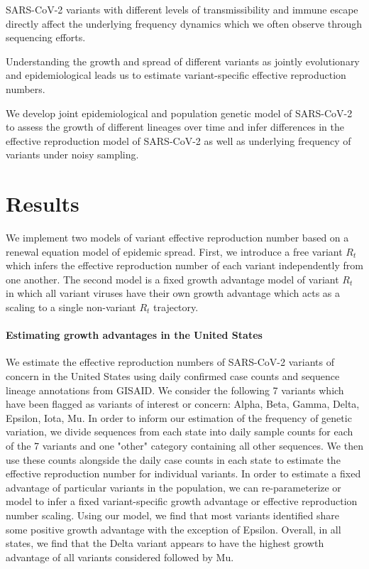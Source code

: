 \documentclass[12pt]{article}
\begin{document}
SARS-CoV-2 variants with different levels of transmissibility and immune escape directly affect the underlying frequency dynamics which we often observe through sequencing efforts.

Understanding the growth and spread of different variants as jointly evolutionary and epidemiological leads us to estimate variant-specific effective reproduction numbers.

We develop joint epidemiological and population genetic model of SARS-CoV-2 to assess the growth of different lineages over time and infer differences in the effective reproduction model of SARS-CoV-2 as well as underlying frequency of variants under noisy sampling.

\section{Results}


We implement two models of variant effective reproduction number based on a renewal equation model of epidemic spread. 
First, we introduce a free variant $R_{t}$ which infers the effective reproduction number of each variant independently from one another. 
The second model is a fixed growth advantage model of variant $R_{t}$ in which all variant viruses have their own growth advantage which acts as a scaling to a single non-variant $R_{t}$ trajectory. 


\paragraph{Estimating growth advantages in the United States}

We estimate the effective reproduction numbers of SARS-CoV-2 variants of concern in the United States using daily confirmed case counts and sequence lineage annotations from GISAID. 
We consider the following 7 variants which have been flagged as variants of interest or concern: Alpha, Beta, Gamma, Delta, Epsilon, Iota, Mu. 
In order to inform our estimation of the frequency of genetic variation, we divide sequences from each state into daily sample counts for each of the 7 variants and one "other" category containing all other sequences. 
We then use these counts alongside the daily case counts in each state to estimate the effective reproduction number for individual variants. 
In order to estimate a fixed advantage of particular variants in the population, we can re-parameterize or model to infer a fixed variant-specific growth advantage or effective reproduction number scaling.
Using our model, we find that most variants identified share some positive growth advantage with the exception of Epsilon. Overall, in all states, we find that the Delta variant appears to have the highest growth advantage of all variants considered followed by Mu. 
\end{document}
